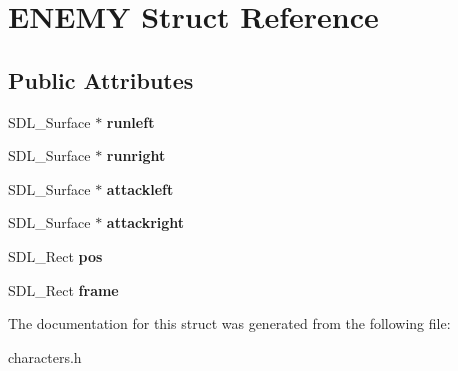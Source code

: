 \hypertarget{structENEMY}{}\section{E\+N\+E\+MY Struct Reference}
\label{structENEMY}
\subsection*{Public Attributes}
\begin{DoxyCompactItemize}
\item 
S\+D\+L\+\_\+\+Surface $\ast$ {\bfseries runleft}\hypertarget{structENEMY_a8b172376f60c8e5ebdecddb1766cd8c6}{}\label{structENEMY_a8b172376f60c8e5ebdecddb1766cd8c6}

\item 
S\+D\+L\+\_\+\+Surface $\ast$ {\bfseries runright}\hypertarget{structENEMY_a8dd80be28d3c7c26b8f7d5dda8503bd4}{}\label{structENEMY_a8dd80be28d3c7c26b8f7d5dda8503bd4}

\item 
S\+D\+L\+\_\+\+Surface $\ast$ {\bfseries attackleft}\hypertarget{structENEMY_a9ddd9c15ea79f6229b38ceb932efa92b}{}\label{structENEMY_a9ddd9c15ea79f6229b38ceb932efa92b}

\item 
S\+D\+L\+\_\+\+Surface $\ast$ {\bfseries attackright}\hypertarget{structENEMY_af64c74e2e48381f9f7568b463b604a06}{}\label{structENEMY_af64c74e2e48381f9f7568b463b604a06}

\item 
S\+D\+L\+\_\+\+Rect {\bfseries pos}\hypertarget{structENEMY_af14b01bbcf770286c273be7ebd4ba0f8}{}\label{structENEMY_af14b01bbcf770286c273be7ebd4ba0f8}

\item 
S\+D\+L\+\_\+\+Rect {\bfseries frame}\hypertarget{structENEMY_ac592c55f4a9026ccdf97c06bc563b236}{}\label{structENEMY_ac592c55f4a9026ccdf97c06bc563b236}

\end{DoxyCompactItemize}


The documentation for this struct was generated from the following file\+:\begin{DoxyCompactItemize}
\item 
characters.\+h\end{DoxyCompactItemize}
